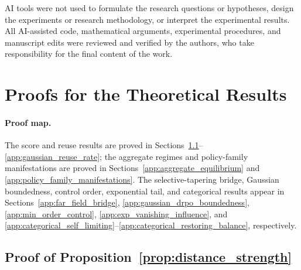 \documentclass{article}
\theoremstyle{plain}
\theoremstyle{definition}
\theoremstyle{remark}
\begin{document}
AI tools were not used to formulate the research questions or hypotheses,
design the experiments or research methodology, or interpret the experimental
results. All AI-assisted code, mathematical arguments, experimental
procedures, and manuscript edits were reviewed and verified by the authors,
who take responsibility for the final content of the work.







\newpage
\appendix
\onecolumn
\section{Proofs for the Theoretical Results}
\label{app:theory_proofs}

\paragraph{Proof map.}
The score and reuse results are proved in
Sections~\ref{app:distance_strength}--\ref{app:gaussian_reuse_rate}; the
aggregate regimes and policy-family manifestations are proved in
Sections~\ref{app:aggregate_equilibrium} and
\ref{app:policy_family_manifestations}. The selective-tapering bridge, Gaussian boundedness, control order,
exponential tail, and categorical results appear in
Sections~\ref{app:far_field_bridge}, \ref{app:gaussian_drpo_boundedness},
\ref{app:min_order_control}, \ref{app:exp_vanishing_influence}, and
\ref{app:categorical_self_limiting}--\ref{app:categorical_restoring_balance},
respectively.

\subsection{Proof of Proposition~\ref{prop:distance_strength}}
\label{app:distance_strength}
\end{document}
